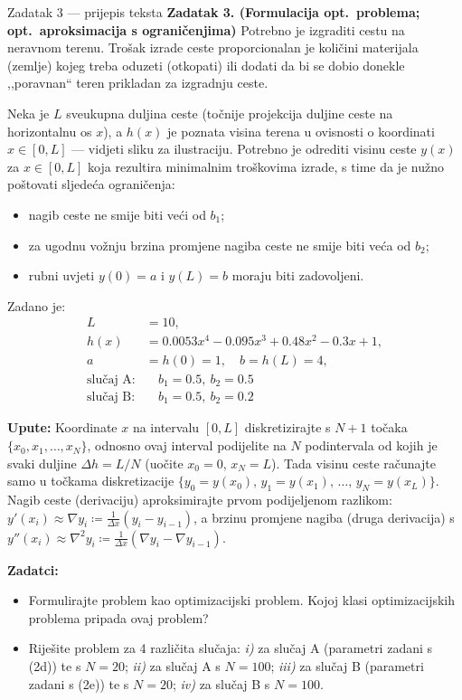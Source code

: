 \begin{zadatak}{Zadatak 3 --- prijepis teksta}
\textbf{Zadatak 3. (Formulacija opt.\ problema; opt.\ aproksimacija s
ograničenjima)} Potrebno je izgraditi cestu na neravnom terenu. Trošak izrade
ceste proporcionalan je količini materijala (zemlje) kojeg treba oduzeti
(otkopati) ili dodati da bi se dobio donekle ,,poravnan`` teren prikladan za
izgradnju ceste.

Neka je $L$ sveukupna duljina ceste (točnije projekcija duljine ceste na
horizontalnu os $x$), a $h(x)$ je poznata visina terena u ovisnosti o koordinati
$x \in [0, L]$ --- vidjeti sliku za ilustraciju. Potrebno je odrediti visinu
ceste $y(x)$ za $x \in [0, L]$ koja rezultira minimalnim troškovima izrade, s
time da je nužno poštovati sljedeća ograničenja:
\begin{itemize}[nosep,leftmargin=*]
  \item nagib ceste ne smije biti veći od $b_1$;
  \item za ugodnu vožnju brzina promjene nagiba ceste ne smije biti veća od $b_2$;
  \item rubni uvjeti $y(0) = a$ i $y(L) = b$ moraju biti zadovoljeni.
\end{itemize}

Zadano je:
\begin{align}
L &= 10, \tag{2a} \\
h(x) &= 0.0053x^4 - 0.095x^3 + 0.48x^2 - 0.3x + 1, \tag{2b} \\
a &= h(0) = 1, \quad b = h(L) = 4, \tag{2c} \\
\text{slučaj A:}& \quad b_1 = 0.5,\ b_2 = 0.5 \tag{2d} \\
\text{slučaj B:}& \quad b_1 = 0.5,\ b_2 = 0.2 \tag{2e}
\end{align}

\textbf{Upute:} Koordinate $x$ na intervalu $[0, L]$ diskretizirajte s $N+1$
točaka $\{x_0, x_1, \dots, x_N\}$, odnosno ovaj interval podijelite na $N$
podintervala od kojih je svaki duljine $\Delta h = L/N$ (uočite $x_0 = 0$,
$x_N = L$). Tada visinu ceste računajte samo u točkama diskretizacije
$\{y_0 = y(x_0),\, y_1 = y(x_1),\, \dots,\, y_N = y(x_L)\}$. Nagib ceste
(derivaciju) aproksimirajte prvom podijeljenom razlikom:
$y'(x_i) \approx \nabla y_i \coloneqq \frac{1}{\Delta x}(y_i - y_{i-1})$, a
brzinu promjene nagiba (druga derivacija) s
$y''(x_i) \approx \nabla^2 y_i \coloneqq \frac{1}{\Delta x}(\nabla y_i - \nabla y_{i-1})$.

\textbf{Zadatci:}
\begin{itemize}[nosep,leftmargin=*]
  \item Formulirajte problem kao optimizacijski problem. Kojoj klasi
        optimizacijskih problema pripada ovaj problem?
  \item Riješite problem za 4 različita slučaja: \emph{i)} za slučaj A
        (parametri zadani s (2d)) te s $N = 20$; \emph{ii)} za slučaj A s
        $N = 100$; \emph{iii)} za slučaj B (parametri zadani s (2e)) te s
        $N = 20$; \emph{iv)} za slučaj B s $N = 100$.
\end{itemize}
\end{zadatak}


